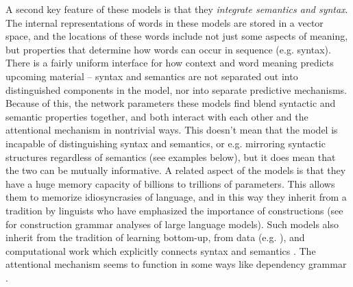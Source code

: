 \documentclass[output=paper,colorlinks,citecolor=brown
]{langscibook}
\begin{document}
A second key feature of these models is that they \textit{integrate semantics and syntax}. The internal representations of words in these models are stored in a vector space, and the locations of these words include not just some aspects of meaning, but properties that determine how words can occur in sequence (e.g. syntax). There is a fairly uniform interface for how context and word meaning predicts upcoming material -- syntax and semantics are not separated out into distinguished components in the model, nor into separate predictive mechanisms. Because of this, the network parameters these models find blend syntactic and semantic properties together, and both interact with each other and the attentional mechanism in nontrivial ways. This doesn't mean that the model is incapable of distinguishing syntax and semantics, or e.g. mirroring syntactic structures regardless of semantics (see examples below), but it does mean that the two can be mutually informative. A related aspect of the models is that they have a huge memory capacity of billions to trillions of parameters. This allows them to memorize idiosyncrasies of language, and in this way they inherit from a tradition by linguists who have emphasized the importance of constructions \citep{adele1995constructions,jackendoff2013constructions,goldberg2006constructions,goldberg2003constructions,tomasello2000item,mccauley2019language,tomasello2005constructing,edelman2007behavioral} (see \citealt{weissweiler2023construction} for construction grammar analyses of large language models). Such models also inherit from the tradition of learning bottom-up, from data (e.g. \citealt{bod2003data,solan2005unsupervised}), and computational work which explicitly connects syntax and semantics \citep{steedman2001syntactic,siskind1996computational,ge2005statistical,kwiatkowski2012probabilistic,liang2009learning}. The attentional mechanism seems to function in some ways like dependency grammar \citep{
tesniere1959elements,hays1964dependency,de2021universal}.
\end{document}
